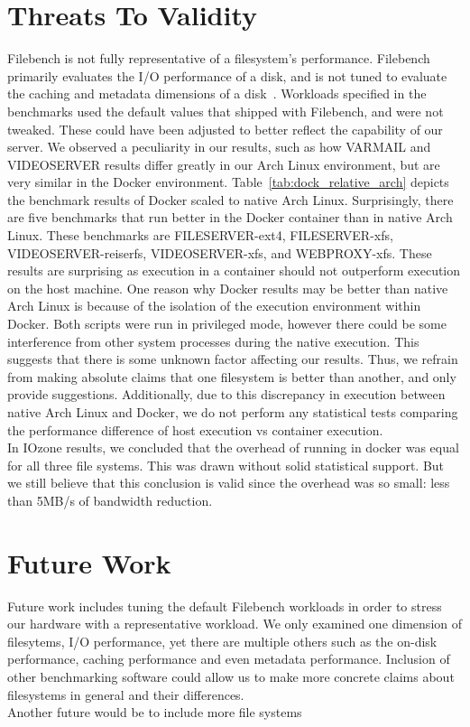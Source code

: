 \documentclass[letterpaper,twocolumn,10pt]{article}
\begin{document}
\section{Threats To Validity}
Filebench is not fully representative of a filesystem's performance. Filebench primarily evaluates the I/O performance of a disk, and is not tuned to evaluate the caching and metadata dimensions of a disk~\cite{tarasov2011benchmarking}. Workloads specified in the benchmarks used the default values that shipped with Filebench, and were not tweaked. These could have been adjusted to better reflect the capability of our server. 
We observed a peculiarity in our results, such as how VARMAIL and VIDEOSERVER results differ greatly in our Arch Linux environment, but are very similar in the Docker environment. Table~\ref{tab:dock_relative_arch} depicts the benchmark results of Docker scaled to native Arch Linux. Surprisingly, there are five benchmarks that run better in the Docker container than in native Arch Linux. These benchmarks are FILESERVER-ext4, FILESERVER-xfs, VIDEOSERVER-reiserfs, VIDEOSERVER-xfs, and WEBPROXY-xfs. These results are surprising as execution in a container should not outperform execution on the host machine. One reason why Docker results may be better than native Arch Linux is because of the isolation of the execution environment within Docker. Both scripts were run in privileged mode, however there could be some interference from other system processes during the native execution. This suggests that there is some unknown factor affecting our results. Thus, we refrain from making absolute claims that one filesystem is better than another, and only provide suggestions. Additionally, due to this discrepancy in execution between native Arch Linux and Docker, we do not perform any statistical tests comparing the performance difference of host execution vs container execution. \\

In IOzone results, we concluded that the overhead of running in docker was equal for all three file systems. This was drawn without solid statistical 
support. But we still believe that this conclusion is valid since the overhead was so small: less than 5MB/s of bandwidth reduction.

\section{Future Work}
Future work includes tuning the default Filebench workloads in order to stress our hardware with a representative workload. We only examined one dimension of filesytems, I/O performance, yet there are multiple others such as the on-disk performance, caching performance and even metadata performance. Inclusion of other benchmarking software could allow us to make more concrete claims about filesystems in general and their differences.\\
Another future would be to include more file systems
\end{document}
